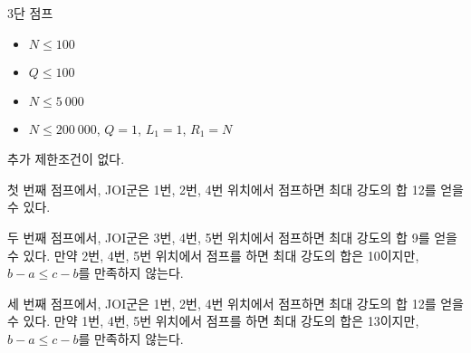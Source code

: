 \begin{problem}{3단 점프}
\begin{itemize}
	\end{itemize}
	
	
	\begin{itemize}
		\item $N \le 100$
		\item $Q \le 100$
	\end{itemize}
	
	\begin{itemize}
		\item $N \le 5\ 000$
	\end{itemize}
	
	
	\begin{itemize}
		\item $N \le 200\ 000$, $Q=1$, $L_1=1$, $R_1=N$
	\end{itemize}
	
	
	추가 제한조건이 없다.
	
	\Examples
		
	\begin{example}
	\end{example}

	\Note
	
	첫 번째 점프에서, JOI군은 1번, 2번, 4번 위치에서 점프하면 최대 강도의 합 12를 얻을 수 있다.
	
	두 번째 점프에서, JOI군은 3번, 4번, 5번 위치에서 점프하면 최대 강도의 합 9를 얻을 수 있다. 만약 2번, 4번, 5번 위치에서 점프를 하면 최대 강도의 합은 10이지만, $b-a \le c-b$를 만족하지 않는다.
	
	세 번째 점프에서, JOI군은 1번, 2번, 4번 위치에서 점프하면 최대 강도의 합 12를 얻을 수 있다. 만약 1번, 4번, 5번 위치에서 점프를 하면 최대 강도의 합은 13이지만, $b-a \le c-b$를 만족하지 않는다.
	
	
	
	
\end{problem}

